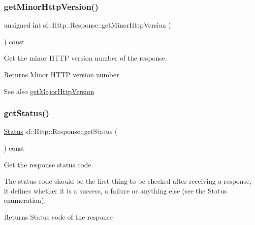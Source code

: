 \subsubsection{\texorpdfstring{getMinorHttpVersion()}{getMinorHttpVersion()}}
{\footnotesize\ttfamily unsigned int sf\+::\+Http\+::\+Response\+::get\+Minor\+Http\+Version (\begin{DoxyParamCaption}{ }\end{DoxyParamCaption}) const}



Get the minor H\+T\+TP version number of the response. 

\begin{DoxyReturn}{Returns}
Minor H\+T\+TP version number
\end{DoxyReturn}
\begin{DoxySeeAlso}{See also}
\mbox{\hyperlink{classsf_1_1_http_1_1_response_ab1c6948f6444fad34d0537e206e398b8}{get\+Major\+Http\+Version}} \begin{DoxyVerb}\end{DoxyVerb}
 
\end{DoxySeeAlso}
\mbox{\label{classsf_1_1_http_1_1_response_a4271651703764fd9a7d2c0315aff20de}} 
\subsubsection{\texorpdfstring{getStatus()}{getStatus()}}
{\footnotesize\ttfamily \mbox{\hyperlink{classsf_1_1_http_1_1_response_a663e071978e30fbbeb20ed045be874d8}{Status}} sf\+::\+Http\+::\+Response\+::get\+Status (\begin{DoxyParamCaption}{ }\end{DoxyParamCaption}) const}



Get the response status code. 

The status code should be the first thing to be checked after receiving a response, it defines whether it is a success, a failure or anything else (see the Status enumeration).

\begin{DoxyReturn}{Returns}
Status code of the response \begin{DoxyVerb}\end{DoxyVerb}
 
\end{DoxyReturn}
\mbox{\label{classsf_1_1_http_1_1_response_aeba90e07eedc362c460590f5e11b9fb2}} 
